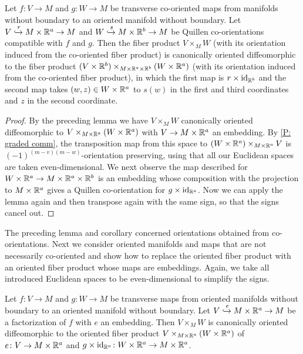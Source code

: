\begin{corollary}\label{C: co-oriented full transition to embedded}
	Let $f \colon V \to M$ and $g \colon W \to M$ be transverse co-oriented maps from manifolds without boundary to an oriented manifold without boundary.
	Let $V \xhookrightarrow{r} M \times \mathbb{R}^a \to M$ and $W\xhookrightarrow{s} M \times \mathbb{R}^b \to M$ be Quillen co-orientations compatible with $f$ and $g$.
	Then the fiber product $V \times_M W$ (with its orientation induced from the co-oriented fiber product) is canonically oriented diffeomorphic to the fiber product $(V \times \mathbb{R}^b ) \times_{M \times \mathbb{R}^a \times \mathbb{R}^b }(W \times \mathbb{R}^a )$ (with its orientation induced from the co-oriented fiber product), in which the first map is $r \times \mathrm{id}_{\mathbb{R}^b }$ and the second map takes $(w,z) \in W \times \mathbb{R}^a $ to $s(w)$ in the first and third coordinates and $z$ in the second coordinate.
\end{corollary}

\begin{proof}
	By the preceding lemma we have $V \times_M W$ canonically oriented diffeomorphic to $V\times_{M \times \mathbb{R}^a }(W \times \mathbb{R}^a )$ with $V \to M \times \mathbb{R}^a $ an embedding.
	By \cref{P: graded comm}, the transposition map from this space to $(W \times \mathbb{R}^a ) \times_{M \times \mathbb{R}^a }V$ is $(-1)^{(m-v)(m-w)}$-orientation preserving, using that all our Euclidean spaces are taken even-dimensional.
	We next observe the map described for $W \times \mathbb{R}^a \to M \times \mathbb{R}^a \times \mathbb{R}^b $ is an embedding whose composition with the projection to $M \times \mathbb{R}^a $ gives a Quillen co-orientation for $g \times \mathrm{id}_{\mathbb{R}^a }$.
	Now we can apply the lemma again and then transpose again with the same sign, so that the signs cancel out.
\end{proof}

The preceding lemma and corollary concerned orientations obtained from co-orientations.
Next we consider oriented manifolds and maps that are not necessarily co-oriented and show how to replace the oriented fiber product with an oriented fiber product whose maps are embeddings.
Again, we take all introduced Euclidean spaces to be even-dimensional to simplify the signs.

\begin{lemma}
	Let $f \colon V \to M$ and $g \colon W \to M$ be transverse maps from oriented manifolds without boundary to an oriented manifold without boundary.
	Let $V \xhookrightarrow{e}M \times \mathbb{R}^a \to M$ be a factorization of $f$ with $e$ an embedding.
	Then $V \times_M W$ is canonically oriented diffeomorphic to the oriented fiber product $V\times_{M \times \mathbb{R}^a } (W \times \mathbb{R}^a )$ of $e \colon V \to M \times \mathbb{R}^a $ and $g \times \mathrm{id}_{\mathbb{R}^a } \colon W \times \mathbb{R}^a \to M \times \mathbb{R}^a $.
\end{lemma}

